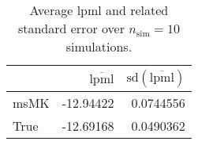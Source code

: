 \begin{table}[H]

\caption{Average lpml and related standard error over $n_{\text{sim}} = 10$ simulations.}
\centering
\begin{tabular}[t]{lrr}
\toprule
  & $\overbar{\text{lpml}}$ & $\text{sd}(\overbar{\text{lpml}})$\\
\midrule
msMK & -12.94422 & 0.0744556\\
True & -12.69168 & 0.0490362\\
\bottomrule
\end{tabular}
\end{table}